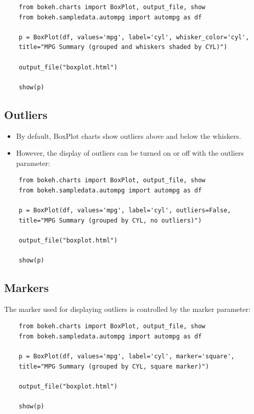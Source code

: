 \documentclass[12pt, a4paper]{report}
\begin{document}
\bigskip
{
	\large
	\begin{framed}
	\begin{verbatim}
	from bokeh.charts import BoxPlot, output_file, show
	from bokeh.sampledata.autompg import autompg as df
	
	p = BoxPlot(df, values='mpg', label='cyl', whisker_color='cyl',
	title="MPG Summary (grouped and whiskers shaded by CYL)")
	
	output_file("boxplot.html")
	
	show(p)
	\end{verbatim}
	\end{framed}
}
\newpage
\subsection*{Outliers}
\begin{itemize}
	\item By default, BoxPlot charts show outliers above and below the whiskers. 
	\item However, the display of outliers can be turned on or off with the outliers parameter:
\end{itemize}

{
	\large
	\begin{framed}
	\begin{verbatim}
	from bokeh.charts import BoxPlot, output_file, show
	from bokeh.sampledata.autompg import autompg as df
	
	p = BoxPlot(df, values='mpg', label='cyl', outliers=False,
	title="MPG Summary (grouped by CYL, no outliers)")
	
	output_file("boxplot.html")
	
	show(p)
	\end{verbatim}
	\end{framed}
}

\subsection*{Markers}
The marker used for displaying outliers is controlled by the marker parameter:
{
	\large
	\begin{framed}
	\begin{verbatim}
	from bokeh.charts import BoxPlot, output_file, show
	from bokeh.sampledata.autompg import autompg as df
	
	p = BoxPlot(df, values='mpg', label='cyl', marker='square',
	title="MPG Summary (grouped by CYL, square marker)")
	
	output_file("boxplot.html")
	
	show(p)
	\end{verbatim}
	\end{framed}
}
\newpage
\end{document}
